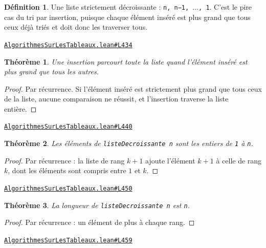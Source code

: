 \documentclass[11pt,a4paper]{article}
\theoremstyle{definition}
\newtheorem{definition}{Définition}
\theoremstyle{plain}
\newtheorem{theoreme}{Théorème}
\newcommand{\source}[2]{\par\smallskip\noindent\hfill{\footnotesize\href{#1}{\texttt{#2}}}\par\smallskip}
\begin{document}
\begin{definition}
Une liste strictement décroissante : \texttt{n, n−1, \(\dots\), 1}. C'est le pire cas du tri par
insertion, puisque chaque élément inséré est plus grand que tous ceux déjà triés et
doit donc les traverser tous.
\end{definition}
\source{https://github.com/Commutator-IO/learn-lean/blob/main/courses/02-lycee/11-informatique-nsi/AlgorithmesSurLesTableaux.lean\#L434}{AlgorithmesSurLesTableaux.lean\#L434}

\begin{theoreme}
Une insertion parcourt toute la liste quand l'élément inséré est plus grand que
tous les autres.
\end{theoreme}
\begin{proof}
Par récurrence. Si l'élément inséré est strictement plus grand que tous ceux de la
liste, aucune comparaison ne réussit, et l'insertion traverse la liste entière.
\end{proof}
\source{https://github.com/Commutator-IO/learn-lean/blob/main/courses/02-lycee/11-informatique-nsi/AlgorithmesSurLesTableaux.lean\#L440}{AlgorithmesSurLesTableaux.lean\#L440}

\begin{theoreme}
Les éléments de \texttt{listeDecroissante n} sont les entiers de \texttt{1} à \texttt{n}.
\end{theoreme}
\begin{proof}
Par récurrence : la liste de rang \(k+1\) ajoute l'élément \(k+1\) à celle de rang
\(k\), dont les éléments sont compris entre \(1\) et \(k\).
\end{proof}
\source{https://github.com/Commutator-IO/learn-lean/blob/main/courses/02-lycee/11-informatique-nsi/AlgorithmesSurLesTableaux.lean\#L450}{AlgorithmesSurLesTableaux.lean\#L450}

\begin{theoreme}
La longueur de \texttt{listeDecroissante n} est \texttt{n}.
\end{theoreme}
\begin{proof}
Par récurrence : un élément de plus à chaque rang.
\end{proof}
\source{https://github.com/Commutator-IO/learn-lean/blob/main/courses/02-lycee/11-informatique-nsi/AlgorithmesSurLesTableaux.lean\#L459}{AlgorithmesSurLesTableaux.lean\#L459}
\end{document}
